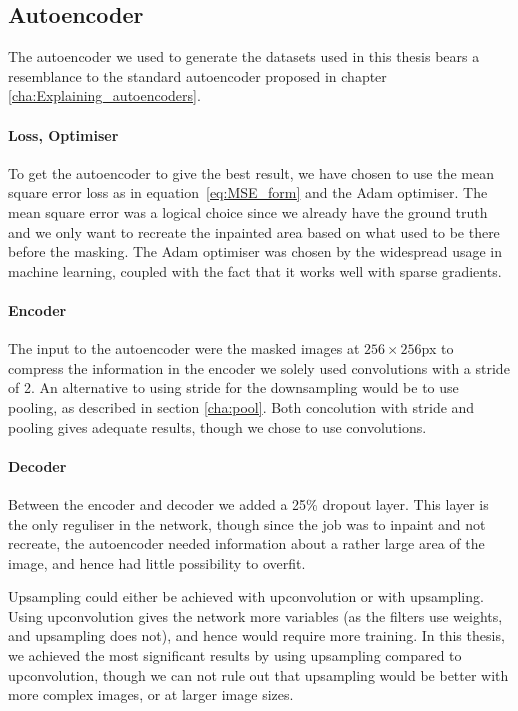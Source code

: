 \subsection{Autoencoder}
The autoencoder we used to generate the datasets used in this thesis bears a resemblance to the standard autoencoder proposed in chapter \ref{cha:Explaining_autoencoders}. 

\paragraph{Loss, Optimiser}
To get the autoencoder to give the best result, we have chosen to use the mean square error loss as in equation~\ref{eq:MSE_form} and the Adam\cite{adam} optimiser.
The mean square error was a logical choice since we already have the ground truth and we only want to recreate the inpainted area based on what used to be there before the masking.
The Adam optimiser was chosen by the widespread usage in machine learning, coupled with the fact that it works well with sparse gradients.

\paragraph{Encoder}
The input to the autoencoder were the masked images at $256 \times 256$px to compress the information in the encoder we solely used convolutions with a stride of 2. An alternative to using stride for the downsampling would be to use pooling, as described in section \ref{cha:pool}. Both concolution with stride and pooling gives adequate results, though we chose to use convolutions.



\paragraph{Decoder}
Between the encoder and decoder we added a 25\% dropout layer. This layer is the only reguliser in the network, though since the job was to inpaint and not recreate, the autoencoder needed information about a rather large area of the image, and hence had little possibility to overfit.

Upsampling could either be achieved with upconvolution or with upsampling.
Using upconvolution gives the network more variables (as the filters use weights, and upsampling does not), and hence would require more training. 
In this thesis, we achieved the most significant results by using upsampling compared to upconvolution, though we can not rule out that upsampling would be better with more complex images, or at larger image sizes.

